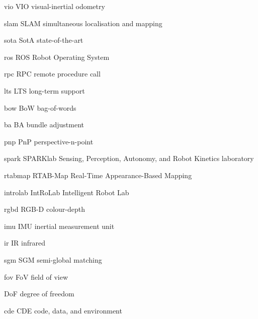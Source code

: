 \newacronym%
    {vio}
    {VIO}
    {visual-inertial odometry}

\newacronym%
    {slam}
    {SLAM}
    {simultaneous localisation and mapping}

\newacronym%
    {sota}
    {SotA}
    {state-of-the-art}

\newacronym%
    {ros}
    {ROS}
    {Robot Operating System}

\newacronym%
    {rpc}
    {RPC}
    {remote procedure call}

\newacronym%
    {lts}
    {LTS}
    {long-term support}

\newacronym%
    {bow}
    {BoW}
    {bag-of-words}

\newacronym%
    {ba}
    {BA}
    {bundle adjustment}

\newacronym%
    {pnp}
    {PnP}
    {perspective-n-point}

\newacronym%
    {spark}
    {SPARKlab}
    {Sensing, Perception, Autonomy, and Robot Kinetics laboratory}

\newacronym%
    {rtabmap}
    {RTAB-Map}
    {Real-Time Appearance-Based Mapping}

\newacronym%
    {introlab}
    {IntRoLab}
    {Intelligent Robot Lab}

\newacronym%
    {rgbd}
    {RGB-D}
    {colour-depth}

\newacronym%
    {imu}
    {IMU}
    {inertial measurement unit}

\newacronym%
    {ir}
    {IR}
    {infrared}

\newacronym%
    {sgm}
    {SGM}
    {semi-global matching}

\newacronym%
    {fov}
    {FoV}
    {field of view}

    {DoF}
    {degree of freedom}

\newacronym%
    {cde}
    {CDE}
    {code, data, and environment}

